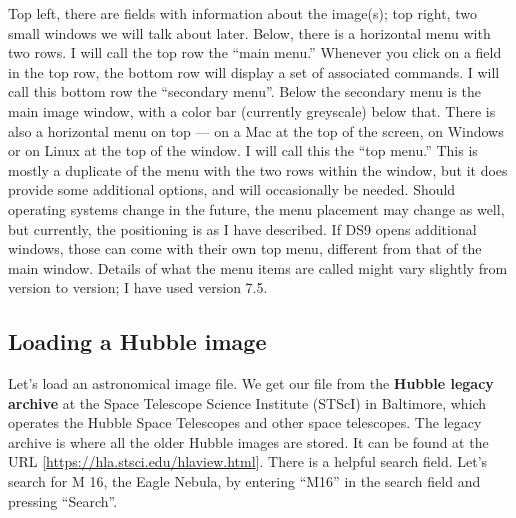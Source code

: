 \documentclass[twocolumn,apj]{openjournal}
\begin{document}
Top left, there are fields with information about the image(s); top right, two small windows we will talk about later. Below, there is a horizontal menu with two rows. I will call the top row the ``main menu.'' Whenever you click on a field in the top row, the bottom row will display a set of associated commands. I will call this bottom row the ``secondary menu''. Below the secondary menu is the main image window, with a color bar (currently greyscale) below that. There is also a horizontal menu on top --- on a Mac at the top of the screen, on Windows or on Linux at the top of the window. I will call this the ``top menu.'' This is mostly a duplicate of the menu with the two rows within the window, but it does provide some additional options, and will occasionally be needed. Should operating systems change in the future, the menu placement may change as well, but currently, the positioning is as I have described. If DS9 opens additional windows, those can come with their own top menu, different from that of the main window. Details of what the menu items are called might vary slightly from version to version; I have used version 7.5.

\subsection{Loading a Hubble image}
\label{LoadHubble}

Let's load an astronomical image file. We get our file from the {\bf Hubble legacy archive} at the Space Telescope Science Institute (STScI) in Baltimore, which operates the Hubble Space Telescopes and other space telescopes. The legacy archive is where all the older Hubble images are stored. It can be found at the URL [\href{https://hla.stsci.edu/hlaview.html}{https://hla.stsci.edu/hlaview.html}]. There is a helpful search field. Let's search for M 16, the Eagle Nebula, by entering ``M16'' in the search field and pressing ``Search''.
\end{document}
